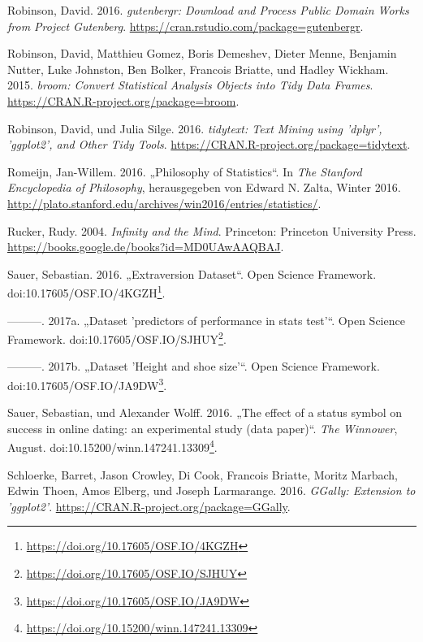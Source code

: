 \documentclass[12pt,ngerman,]{book}
\let\rmarkdownfootnote\footnote%
\def\footnote{\protect\rmarkdownfootnote}
\renewcommand{\href}[2]{#2\footnote{\url{#1}}}
\begin{document}
\hypertarget{ref-R-gutenbergr}{}
Robinson, David. 2016. \emph{gutenbergr: Download and Process Public
Domain Works from Project Gutenberg}.
\url{https://cran.rstudio.com/package=gutenbergr}.

\hypertarget{ref-R-broom}{}
Robinson, David, Matthieu Gomez, Boris Demeshev, Dieter Menne, Benjamin
Nutter, Luke Johnston, Ben Bolker, Francois Briatte, und Hadley Wickham.
2015. \emph{broom: Convert Statistical Analysis Objects into Tidy Data
Frames}. \url{https://CRAN.R-project.org/package=broom}.

\hypertarget{ref-R-tidytext}{}
Robinson, David, und Julia Silge. 2016. \emph{tidytext: Text Mining
using 'dplyr', 'ggplot2', and Other Tidy Tools}.
\url{https://CRAN.R-project.org/package=tidytext}.

\hypertarget{ref-sep-statistics}{}
Romeijn, Jan-Willem. 2016. „Philosophy of Statistics``. In \emph{The
Stanford Encyclopedia of Philosophy}, herausgegeben von Edward N. Zalta,
Winter 2016.
\url{http://plato.stanford.edu/archives/win2016/entries/statistics/}.

\hypertarget{ref-ruckerinfinity}{}
Rucker, Rudy. 2004. \emph{Infinity and the Mind}. Princeton: Princeton
University Press. \url{https://books.google.de/books?id=MD0UAwAAQBAJ}.

\hypertarget{ref-Sauer_2016}{}
Sauer, Sebastian. 2016. „Extraversion Dataset``. Open Science Framework.
doi:\href{https://doi.org/10.17605/OSF.IO/4KGZH}{10.17605/OSF.IO/4KGZH}.

\hypertarget{ref-Sauer_2017}{}
---------. 2017a. „Dataset 'predictors of performance in stats test'``.
Open Science Framework.
doi:\href{https://doi.org/10.17605/OSF.IO/SJHUY}{10.17605/OSF.IO/SJHUY}.

\hypertarget{ref-Sauer_2017a}{}
---------. 2017b. „Dataset 'Height and shoe size'``. Open Science
Framework.
doi:\href{https://doi.org/10.17605/OSF.IO/JA9DW}{10.17605/OSF.IO/JA9DW}.

\hypertarget{ref-sauer_wolff}{}
Sauer, Sebastian, und Alexander Wolff. 2016. „The effect of a status
symbol on success in online dating: an experimental study (data
paper)``. \emph{The Winnower}, August.
doi:\href{https://doi.org/10.15200/winn.147241.13309}{10.15200/winn.147241.13309}.

\hypertarget{ref-R-GGally}{}
Schloerke, Barret, Jason Crowley, Di Cook, Francois Briatte, Moritz
Marbach, Edwin Thoen, Amos Elberg, und Joseph Larmarange. 2016.
\emph{GGally: Extension to 'ggplot2'}.
\url{https://CRAN.R-project.org/package=GGally}.
\end{document}
